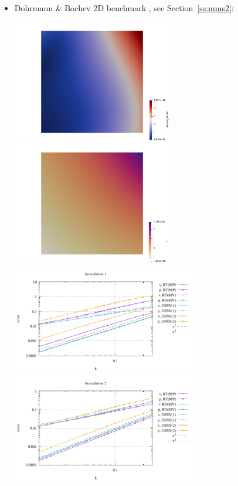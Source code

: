 \begin{itemize}
\item Dohrmann \& Bochev 2D benchmark \cite{dobo04,bodg06}, see Section~\ref{ss:mms2}:

\begin{center}
\includegraphics[width=7cm]{python_codes/fieldstone_77/results/db2D/vel}
\includegraphics[width=7cm]{python_codes/fieldstone_77/results/db2D/press}\\
\includegraphics[width=8cm]{python_codes/fieldstone_77/results/db2D/errors_form1}
\includegraphics[width=8cm]{python_codes/fieldstone_77/results/db2D/errors_form2}\\

\end{center}
\end{itemize}
